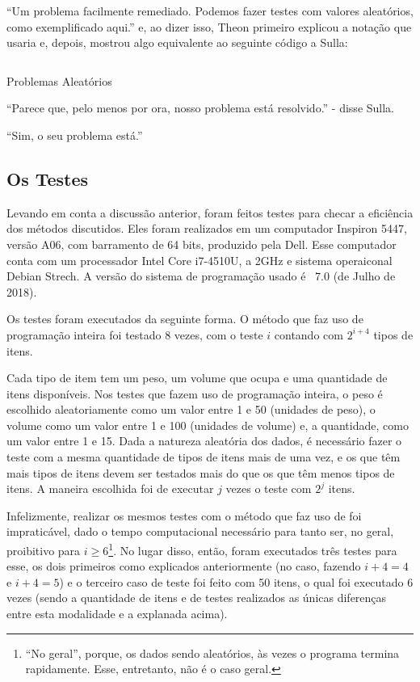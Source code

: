 \documentclass{article}
\begin{document}
``Um problema facilmente remediado. Podemos fazer testes com valores
aleatórios, como exemplificado aqui.'' e, ao dizer isso, Theon
primeiro explicou a notação que usaria e, depois, mostrou algo
equivalente ao seguinte código a Sulla:

\begin{listing}[H]
  \inputminted{prolog}{../Exemplos/Cap12/test/random.ecl}
  \caption{Problemas Aleatórios}\label{lst:random}
\end{listing}

``Parece que, pelo menos por ora, nosso problema está resolvido.'' -
disse Sulla.

``Sim, o seu problema está.''

\subsection{Os Testes}

Levando em conta a discussão anterior, foram feitos testes para
checar a eficiência dos métodos discutidos. Eles foram realizados em
um computador Inspiron 5447, versão A06, com barramento de 64 bits,
produzido pela Dell. Esse computador conta com um processador Intel
Core i7-4510U, a 2GHz e sistema operaiconal Debian Strech. A versão do
sistema de programação usado é \eclipse\ 7.0 (de Julho de 2018). 

Os testes foram executados da seguinte forma. O método que faz uso de
programação inteira foi testado 8 vezes, com o teste $i$ contando
com $2^{i+4}$ tipos de itens.

Cada tipo de item tem um peso, um volume que ocupa e uma quantidade
de itens disponíveis. Nos testes que fazem uso de programação
inteira, o peso é escolhido aleatoriamente como um valor entre 1 e
50 (unidades de peso), o volume como um valor entre 1 e 100
(unidades de volume) e, a quantidade, como um valor entre 1 e
15. Dada a natureza aleatória dos dados, é necessário fazer o
teste com a mesma quantidade de tipos de itens mais de uma vez, e os
que têm mais tipos de itens devem ser testados mais do que os que
têm menos tipos de itens. A maneira escolhida foi de executar $j$ vezes
o teste com $2^j$ itens.

Infelizmente, realizar os mesmos testes com o método que faz uso de
 foi impraticável, dado o tempo
computacional necessário para tanto ser, no geral, proibitivo para
$i \geq 6$\footnote{``No geral'', porque, os dados sendo aleatórios,
  às vezes o programa termina rapidamente. Esse, entretanto, não é o
  caso geral.}. No lugar disso, então, foram executados três testes
para esse, os dois primeiros como explicados anteriormente (no caso,
fazendo $i + 4 = 4$ e $i + 4 = 5$) e o terceiro caso de teste foi
feito com 50 itens, o qual foi executado 6 vezes (sendo a quantidade de
itens e de testes realizados as únicas diferenças entre esta
modalidade e a explanada acima).
\end{document}
